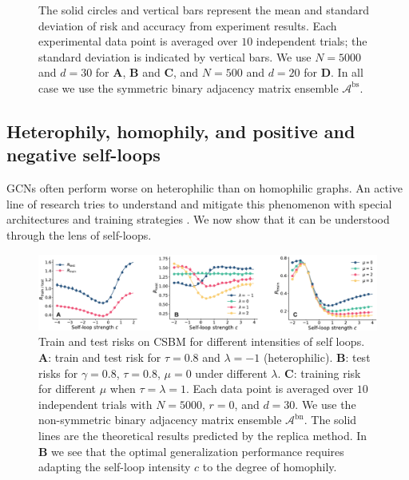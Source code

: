 \documentclass[9pt,twocolumn]{pnas-new}
\begin{document}
\begin{figure}[t]
{    %
    The solid circles and vertical bars represent the mean and standard deviation of risk and accuracy from experiment results.
    Each experimental data point is averaged over $10$ independent trials; the standard deviation is indicated by vertical bars.  We use $N=5000$ and $d=30$ for \textbf{\textsf{A}}, \textbf{\textsf{B}} and \textbf{\textsf{C}}, and $N=500$ and $d=20$ for \textbf{\textsf{D}}. In all case we use the symmetric binary adjacency matrix ensemble $\mathcal{A}^{\text{bs}}$. } 
    \label{fig_acc}
\end{figure}







\subsection*{Heterophily, homophily, and positive and negative self-loops}

GCNs often perform worse on heterophilic than on homophilic graphs. An active line of research tries to understand and mitigate this phenomenon with special architectures and training strategies \cite{li2022finding,luan2022revisiting,chien2021adaptive}. We now show that it can be understood through the lens of self-loops.

\begin{figure}[h!]
    \includegraphics[width=\linewidth]{figs_selfloop.pdf}
    \caption{Train and test risks on CSBM for different intensities of self loops. \textbf{\textsf{A}}: train and test risk for $\tau=0.8$ and $\lambda=-1$ (heterophilic). \textbf{\textsf{B}}: test risks for $\gamma=0.8$, $\tau=0.8$, $\mu=0$ under different $\lambda$. \textbf{\textsf{C}}: training risk for different $\mu$ when $\tau=\lambda=1$. Each data point is averaged over $10$ independent trials with $N=5000$, $r=0$, and $d=30$. We use the non-symmetric binary adjacency matrix ensemble $\mathcal{A}^{\text{bn}}$. The solid lines are the theoretical results predicted by the replica method. In \textbf{\textsf{B}} we see that the optimal generalization performance requires adapting the self-loop intensity $c$ to the degree of homophily.} 
    \label{fig_selfloop}
\end{figure}
    
\end{document}
